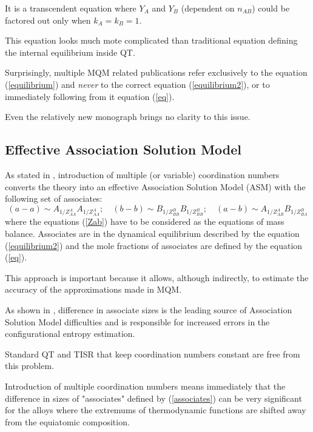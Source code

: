 \documentclass[12pt,abstract]{scrartcl}
\begin{document}
It is a transcendent equation where $Y_A$  and  $Y_B$ (dependent on $n_{AB}$) could be factored out only when  $k_A = k_B = 1$.

This equation looks much mote complicated than traditional equation defining the internal equilibrium inside QT.

Surprisingly, multiple MQM related publications refer  exclusively to the equation (\ref{equilibrium}) and \textit{never} to the correct equation (\ref{equilibrium2}), or to immediately following from it equation (\ref{eq}). 

Even  the relatively new monograph \cite{pelton2018phase} brings no clarity to this issue.

\subsection{Effective Association Solution Model}

As stated in \cite{Pelton_p1}, introduction of multiple (or variable) coordination numbers converts the theory into an effective Association Solution Model (ASM) with the following set of associates:
\begin{equation} \label{associates}
(a - a)  \sim  A_{1/Z_{AA}^A}A_{1/Z_{AA}^A}; \quad (b - b) \sim B_{1/Z_{BB}^B}B_{1/Z_{BB}^B}; \quad (a - b) \sim
A_{1/Z_{AB}^A} B_{1/Z_{BA}^B}
\end{equation} 
where  the equations (\ref{Zab}) have to be considered as the equations of mass balance. Associates are in the dynamical equilibrium described by the equation (\ref{equilibrium2}) and the mole fractions of associates  are defined by the  equation (\ref{eq}).


This approach is important because it allows, although indirectly, to estimate the accuracy of the approximations made in MQM.

As shown in \cite{TISR_p3}, difference in associate sizes is the leading source of Association Solution Model difficulties and is responsible for increased errors in the configurational entropy estimation. 

Standard QT and TISR that keep coordination numbers constant are free from this problem.

Introduction of multiple coordination numbers means immediately that the difference in sizes of "associates" defined by (\ref{associates})  can be very significant for the alloys where the extremums of thermodynamic functions are shifted away from the equiatomic composition.
\end{document}
